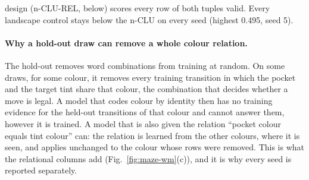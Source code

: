 \documentclass{article} %
\begin{document}
design (n-CLU-REL, below) scores every row of both tuples valid. %
Every landscape
control stays below the n-CLU on every seed (highest 0.495, seed 5).

\paragraph{Why a hold-out draw can remove a whole colour relation.} The hold-out removes word
combinations from training at random. On some draws, for some colour, it removes every training
transition in which the pocket and the target tint share that colour, the combination that decides
whether a move is legal. A model that codes colour by identity then has no training evidence for the
held-out transitions of that colour and cannot answer them, however it is trained. A model that is
also given the relation ``pocket colour equals tint colour'' can: the relation is learned from the
other colours, where it is seen, and applies unchanged to the colour whose rows were removed. This is
what the relational columns add (Fig.~\ref{fig:maze-wm}(c)), and it is why every seed is reported
separately.

\end{document}
